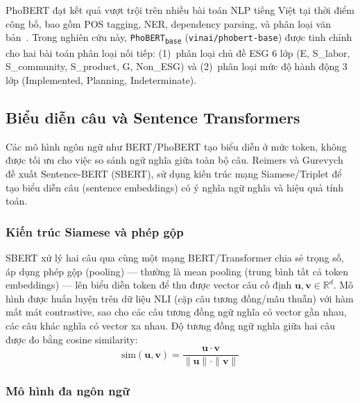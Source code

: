 PhoBERT đạt kết quả vượt trội trên nhiều bài toán NLP tiếng Việt tại thời điểm công bố, bao gồm POS tagging, NER, dependency parsing, và phân loại văn bản~\cite{nguyen2020phobert}. Trong nghiên cứu này, \texttt{PhoBERT\textsubscript{base}} (\texttt{vinai/phobert-base}) được tinh chỉnh cho hai bài toán phân loại nối tiếp: (1)~phân loại chủ đề ESG 6 lớp (E, S\_labor, S\_community, S\_product, G, Non\_ESG) và (2)~phân loại mức độ hành động 3 lớp (Implemented, Planning, Indeterminate).


\subsection{Biểu diễn câu và Sentence Transformers}
\label{subsec:sentence_transformers}

Các mô hình ngôn ngữ như BERT/PhoBERT tạo biểu diễn ở mức token, không được tối ưu cho việc so sánh ngữ nghĩa giữa toàn bộ câu. Reimers và Gurevych~\cite{reimers2019sentence} đề xuất Sentence-BERT (SBERT), sử dụng kiến trúc mạng Siamese/Triplet để tạo biểu diễn câu (sentence embeddings) có ý nghĩa ngữ nghĩa và hiệu quả tính toán.


\subsubsection{Kiến trúc Siamese và phép gộp}

SBERT xử lý hai câu qua cùng một mạng BERT/Transformer chia sẻ trọng số, áp dụng phép gộp (pooling) --- thường là mean pooling (trung bình tất cả token embeddings) --- lên biểu diễn token để thu được vector câu cố định $\mathbf{u}, \mathbf{v} \in \mathbb{R}^d$. Mô hình được huấn luyện trên dữ liệu NLI (cặp câu tương đồng/mâu thuẫn) với hàm mất mát contrastive, sao cho các câu tương đồng ngữ nghĩa có vector gần nhau, các câu khác nghĩa có vector xa nhau. Độ tương đồng ngữ nghĩa giữa hai câu được đo bằng cosine similarity:
\begin{equation}
    \text{sim}(\mathbf{u}, \mathbf{v}) = \frac{\mathbf{u} \cdot \mathbf{v}}{\|\mathbf{u}\| \cdot \|\mathbf{v}\|}
    \label{eq:cosine_sim}
\end{equation}



\subsubsection{Mô hình đa ngôn ngữ}

